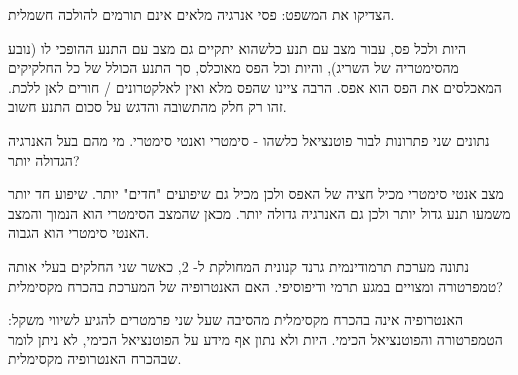 \documentclass{article}
\begin{document}
\begin{Question}
\begin{SubQuestion}
הצדיקו את המשפט: פסי אנרגיה מלאים אינם תורמים להולכה חשמלית.
\end{SubQuestion}
\begin{SubAnswer}
    היות ולכל פס, עבור מצב עם תנע כלשהוא יתקיים גם מצב עם התנע ההופכי לו (נובע מהסימטריה של השריג), והיות וכל הפס מאוכלס, סך התנע הכולל של כל החלקיקים המאכלסים את הפס הוא אפס. הרבה ציינו שהפס מלא ואין לאלקטרונים / חורים לאן ללכת. זהו רק חלק מהתשובה והדגש על סכום התנע חשוב.
\end{SubAnswer}
\begin{SubQuestion}
נתונים שני פתרונות לבור פוטנציאל כלשהו - סימטרי ואנטי סימטרי. מי מהם בעל האנרגיה הגדולה יותר?
\end{SubQuestion}
\begin{SubAnswer}
    מצב אנטי סימטרי מכיל חציה של האפס ולכן מכיל גם שיפועים "חדים" יותר. שיפוע חד יותר משמעו תנע גדול יותר ולכן גם האנרגיה גדולה יותר. מכאן שהמצב הסימטרי הוא הנמוך והמצב האנטי סימטרי הוא הגבוה.
\end{SubAnswer}
\begin{SubQuestion}
    נתונה מערכת תרמודינמית גרנד קנונית המחולקת ל- 2, כאשר שני החלקים בעלי אותה טמפרטורה ומצויים במגע תרמי ודיפוסיפי. האם האנטרופיה של המערכת בהכרח מקסימלית?
\end{SubQuestion}
\begin{SubAnswer}
    האנטרופיה אינה בהכרח מקסימלית מהסיבה שעל שני פרמטרים להגיע לשיווי משקל: הטמפרטורה והפוטנציאל הכימי. היות ולא נתון אף מידע על הפוטנציאל הכימי, לא ניתן לומר שבהכרח האנטרופיה מקסימלית.
\end{SubAnswer}
\end{Question}%
\end{document}
